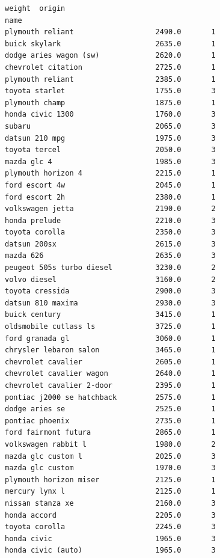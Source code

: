 \documentclass[11pt]{article}
\makeatletter
\newcommand{\boxspacing}{\kern\kvtcb@left@rule\kern\kvtcb@boxsep}
\newcommand{\prompt}[4]{
        {\ttfamily\llap{{\color{#2}[#3]:\hspace{3pt}#4}}\vspace{-\baselineskip}}
    }
\makeatother
\begin{document}
            \begin{tcolorbox}[breakable, size=fbox, boxrule=.5pt, pad at break*=1mm, opacityfill=0]
\prompt{Out}{outcolor}{93}{\boxspacing}
\begin{Verbatim}[commandchars=\\\{\}]
                                   weight  origin
name
plymouth reliant                   2490.0       1
buick skylark                      2635.0       1
dodge aries wagon (sw)             2620.0       1
chevrolet citation                 2725.0       1
plymouth reliant                   2385.0       1
toyota starlet                     1755.0       3
plymouth champ                     1875.0       1
honda civic 1300                   1760.0       3
subaru                             2065.0       3
datsun 210 mpg                     1975.0       3
toyota tercel                      2050.0       3
mazda glc 4                        1985.0       3
plymouth horizon 4                 2215.0       1
ford escort 4w                     2045.0       1
ford escort 2h                     2380.0       1
volkswagen jetta                   2190.0       2
honda prelude                      2210.0       3
toyota corolla                     2350.0       3
datsun 200sx                       2615.0       3
mazda 626                          2635.0       3
peugeot 505s turbo diesel          3230.0       2
volvo diesel                       3160.0       2
toyota cressida                    2900.0       3
datsun 810 maxima                  2930.0       3
buick century                      3415.0       1
oldsmobile cutlass ls              3725.0       1
ford granada gl                    3060.0       1
chrysler lebaron salon             3465.0       1
chevrolet cavalier                 2605.0       1
chevrolet cavalier wagon           2640.0       1
chevrolet cavalier 2-door          2395.0       1
pontiac j2000 se hatchback         2575.0       1
dodge aries se                     2525.0       1
pontiac phoenix                    2735.0       1
ford fairmont futura               2865.0       1
volkswagen rabbit l                1980.0       2
mazda glc custom l                 2025.0       3
mazda glc custom                   1970.0       3
plymouth horizon miser             2125.0       1
mercury lynx l                     2125.0       1
nissan stanza xe                   2160.0       3
honda accord                       2205.0       3
toyota corolla                     2245.0       3
honda civic                        1965.0       3
honda civic (auto)                 1965.0       3

\end{Verbatim}
\end{tcolorbox}
\end{document}
